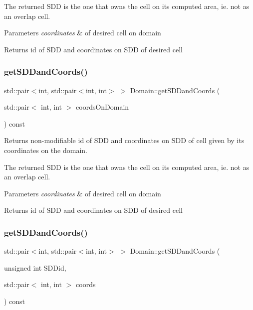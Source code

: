 The returned S\+DD is the one that owns the cell on its computed area, ie. not as an overlap cell.


\begin{DoxyParams}{Parameters}
{\em coordinates} & of desired cell on domain\\
\hline
\end{DoxyParams}
\begin{DoxyReturn}{Returns}
id of S\+DD and coordinates on S\+DD of desired cell 
\end{DoxyReturn}
\mbox{\label{classDomain_a155bbf1a1abd44c98cf78c090259b5a4}} 
\subsubsection{\texorpdfstring{get\+S\+D\+Dand\+Coords()}{getSDDandCoords()}\hspace{0.1cm}{\footnotesize\ttfamily [3/4]}}
{\footnotesize\ttfamily std\+::pair$<$int, std\+::pair$<$int, int$>$ $>$ Domain\+::get\+S\+D\+Dand\+Coords (\begin{DoxyParamCaption}\item[{std\+::pair$<$ int, int $>$}]{coords\+On\+Domain }\end{DoxyParamCaption}) const}



Returns non-\/modifiable id of S\+DD and coordinates on S\+DD of cell given by its coordinates on the domain. 

The returned S\+DD is the one that owns the cell on its computed area, ie. not as an overlap cell.


\begin{DoxyParams}{Parameters}
{\em coordinates} & of desired cell on domain\\
\hline
\end{DoxyParams}
\begin{DoxyReturn}{Returns}
id of S\+DD and coordinates on S\+DD of desired cell 
\end{DoxyReturn}
\mbox{\label{classDomain_a777cc4eed9570aea2477ef41f26566ff}} 
\subsubsection{\texorpdfstring{get\+S\+D\+Dand\+Coords()}{getSDDandCoords()}\hspace{0.1cm}{\footnotesize\ttfamily [4/4]}}
{\footnotesize\ttfamily std\+::pair$<$int, std\+::pair$<$int, int$>$ $>$ Domain\+::get\+S\+D\+Dand\+Coords (\begin{DoxyParamCaption}\item[{unsigned int}]{S\+D\+Did,  }\item[{std\+::pair$<$ int, int $>$}]{coords }\end{DoxyParamCaption}) const}




